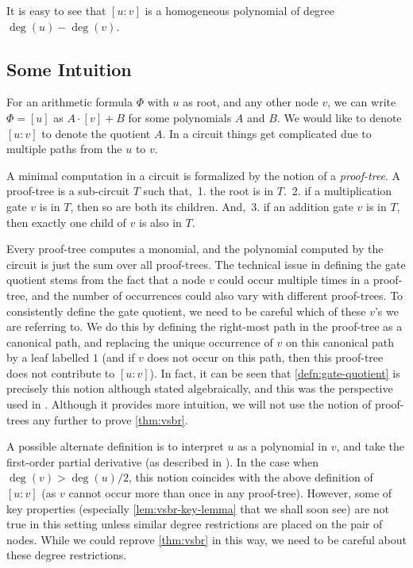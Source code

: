 \noindent
It is easy to see that $[u:v]$ is a homogeneous polynomial of degree
$\deg(u) - \deg(v)$. 

\subsection*{Some Intuition}

For an arithmetic formula $\Phi$ with $u$ as root, and any other node
$v$, we can write $\Phi = [u]$ as $A \cdot [v] + B$ for some
polynomials $A$ and $B$. 
We would like to denote $[u:v]$ to denote the
quotient $A$. 
In a circuit things get complicated due to multiple
paths from the $u$ to $v$.

A minimal computation in a circuit is formalized by the notion of a \emph{proof-tree}. 
A proof-tree is a sub-circuit $T$ such that,
\,1. the root is in $T$.
\,2. if a multiplication gate $v$ is in $T$, then so are both its children. 
And,
\,3. if an addition gate $v$ is in $T$, then exactly one child of $v$ is also in $T$.

Every proof-tree computes a monomial, and the polynomial computed by
the circuit is just the sum over all proof-trees. 
The technical issue
in defining the gate quotient stems from the fact that a node $v$
could occur multiple times in a proof-tree, and the number of
occurrences could also vary with different proof-trees. 
To
consistently define the gate quotient, we need to be careful which of
these $v$'s we are referring to. 
We do this by defining the right-most
path in the proof-tree as a canonical path, and replacing the unique
occurrence of $v$ on this canonical path by a leaf labelled $1$ (and
if $v$ does not occur on this path, then this proof-tree does not
contribute to $[u:v]$). 
In fact, it can be seen that
\autoref{defn:gate-quotient} is precisely this notion although
stated algebraically, and this was the perspective used in
\cite{ajmv98}. 
Although it provides more intuition, we
will not use the notion of proof-trees any further to prove
\autoref{thm:vsbr}.

A possible alternate definition is to interpret $u$ as a polynomial in
$v$, and take the first-order partial derivative (as described in
\cite{sy}). 
In the case when $\deg(v) > \deg(u)/2$, this notion
coincides with the above definition of $[u:v]$ (as $v$ cannot occur
more than once in any proof-tree). 
However, some of key properties
(especially \autoref{lem:vsbr-key-lemma} that we shall soon see) are
not true in this setting unless similar degree restrictions are placed
on the pair of nodes. 
While we could reprove \autoref{thm:vsbr} in
this way, we need to be careful about these degree restrictions.


